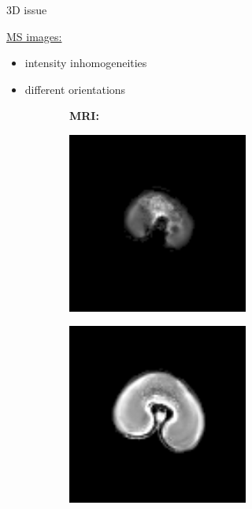 \documentclass[10pt]{beamer}
\begin{document}
\begin{frame}{3D issue}
  
  \underline{MS images:}
  \begin{itemize}
  \item intensity inhomogeneities
  \item different orientations
  \end{itemize}

  \vspace{-0.3cm}
   \begin{figure}[ht]
     \centering
     \begin{subfigure}[b]{0.15\textwidth}  
       \textbf{MRI:}
     \end{subfigure}%
     \begin{subfigure}[c]{0.3\textwidth}
       \centering
       \includegraphics[width=0.65\textwidth]{fig/3D_density_aligned_manual0000}%
     \end{subfigure}%
     \begin{subfigure}[c]{0.3\textwidth}
       \centering
       \includegraphics[width=0.65\textwidth]{fig/3D_density_aligned_manual0003}%

\end{subfigure}
\end{figure}
\end{frame}
\end{document}
